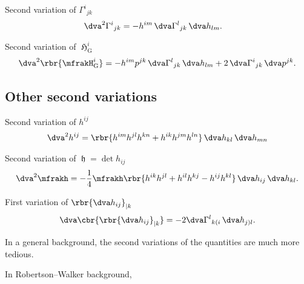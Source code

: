 \documentclass[a4paper,11pt]{article}
\begin{document}
Second variation of $\Gamma^i{}_{jk}$
\begin{align}
\dva^2 \Gamma^i{}_{jk} &=
- h^{im} \,\dva\Gamma^{l}{}_{jk} \,\dva h_{lm}.
\end{align}

Second variation of $\mfrakH_\text{G}^i$
\begin{align}
\dva^2\rbr{\mfrakH_\text{G}^i} = -h^{im}p^{jk}
\,\dva\Gamma^{l}{}_{jk}\,\dva h_{lm} + 2\,\dva\Gamma^{i}{}_{jk}\,\dva p^{jk}.
\end{align}


\subsection*{Other second variations}

Second variation of $h^{ij}$
\begin{align}
\dva^2 h^{ij} = \rbr{h^{im}h^{jl}h^{kn}+h^{ik}h^{jm}h^{ln}}
\,\dva h_{kl}\,\dva h_{mn}
\end{align}

Second variation of $\mfrakh = \det h_{ij}$
\begin{align}
\dva^2 \mfrakh = -\frac{1}{4} \mfrakh \rbr{
h^{ik}h^{jl}+h^{il}h^{kj}-h^{ij}h^{kl}}\,\dva h_{ij}\,\dva h_{kl}.
\end{align}

First variation of $\rbr{\dva h_{ij}}_{|k}$
\begin{align}
\dva\cbr{\rbr{\dva h_{ij}}_{|k}} = -2 \dva\Gamma^l{}_{k(i}\,\dva h_{j)l}.
\end{align}



In a general background, the second variations of the quantities are much more 
tedious.

In Robertson--Walker background, 


\printbibliography
\end{document}
